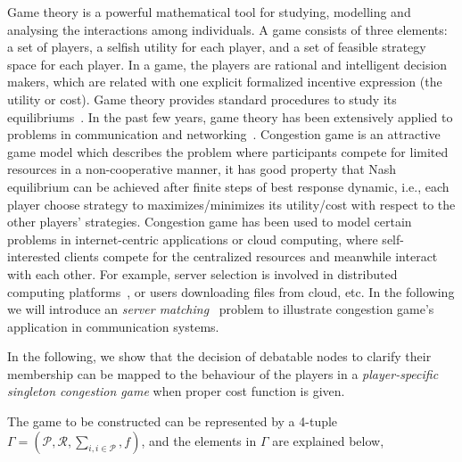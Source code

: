 \documentclass[10pt,journal,compsoc]{IEEEtran}
\theoremstyle{mytheoremstyle}
\theoremstyle{mytheoremstyle}
\theoremstyle{mytheoremstyle}
\newcommand{\ie}{i.e., }
\begin{document}
Game theory is a powerful mathematical tool for studying, modelling and analysing the interactions among individuals.
A game consists of three elements: a set of players, a selfish utility for each player, and a set of feasible strategy space for each player. In a game, the players are rational and intelligent decision makers, which are related with one explicit formalized incentive expression (the utility or cost).
Game theory provides standard procedures to study its equilibriums~\cite{game_for_communication_01}.
In the past few years, game theory has been extensively applied to problems in communication and networking~\cite{Neel06analysisand, Wang_gtc_crn_survey_2010}.
Congestion game is an attractive game model which describes the problem where participants compete for limited resources in a non-cooperative manner, it has good property that Nash equilibrium can be achieved after finite steps of best response dynamic, \ie each player choose strategy to maximizes/minimizes its utility/cost with respect to the other players' strategies.
Congestion game has been used to model certain problems in internet-centric applications or cloud computing, where self-interested clients compete for the centralized resources and meanwhile interact with each other.
For example, server selection is involved in distributed computing platforms~\cite{Cloud_Computing_2010}, or users downloading files from cloud, etc.
In the following we will introduce an \textit{server matching}~\cite{kothari:congestion_serverMatching} problem to illustrate congestion game's application in communication systems.


In the following, we show that the decision of debatable nodes to clarify their membership can be mapped to the behaviour of the players in a \textit{player-specific singleton congestion game} when proper cost function is given.

The game to be constructed can be represented by a 4-tuple $\Gamma=(\mathcal{P},\mathcal{R},\sum_{i, i \in \mathcal{P}}, f)$, and the elements in $\Gamma$ are explained below,
\end{document}
